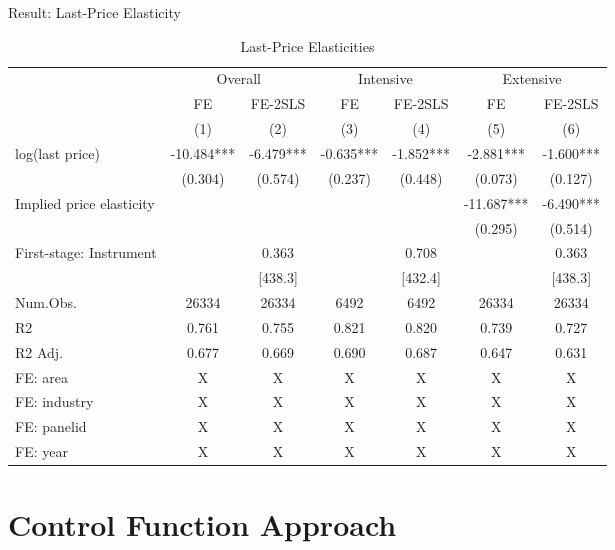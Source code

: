 \documentclass[
  ignorenonframetext,
  aspectratio=169,
]{beamer}
\begin{document}
\begin{frame}{Result: Last-Price Elasticity}
\protect\hypertarget{result-last-price-elasticity}{}
\begin{table}

\caption{\label{tab:unnamed-chunk-13}Last-Price Elasticities}
\centering
\fontsize{7}{9}\selectfont
\begin{tabular}[t]{lcccccc}
\toprule
\multicolumn{1}{c}{ } & \multicolumn{2}{c}{Overall} & \multicolumn{2}{c}{Intensive} & \multicolumn{2}{c}{Extensive} \\
\cmidrule(l{3pt}r{3pt}){2-3} \cmidrule(l{3pt}r{3pt}){4-5} \cmidrule(l{3pt}r{3pt}){6-7}
\multicolumn{1}{c}{ } & \multicolumn{1}{c}{FE} & \multicolumn{1}{c}{FE-2SLS} & \multicolumn{1}{c}{FE} & \multicolumn{1}{c}{FE-2SLS} & \multicolumn{1}{c}{FE} & \multicolumn{1}{c}{FE-2SLS} \\
\cmidrule(l{3pt}r{3pt}){2-2} \cmidrule(l{3pt}r{3pt}){3-3} \cmidrule(l{3pt}r{3pt}){4-4} \cmidrule(l{3pt}r{3pt}){5-5} \cmidrule(l{3pt}r{3pt}){6-6} \cmidrule(l{3pt}r{3pt}){7-7}
  & (1) & (2) & (3) & (4) & (5) & (6)\\
\midrule
log(last price) & -10.484*** & -6.479*** & -0.635*** & -1.852*** & -2.881*** & -1.600***\\
 & (0.304) & (0.574) & (0.237) & (0.448) & (0.073) & (0.127)\\
\midrule
Implied price elasticity &  &  &  &  & -11.687*** & -6.490***\\
 &  &  &  &  & (0.295) & (0.514)\\
First-stage: Instrument &  & 0.363 &  & 0.708 &  & 0.363\\
 &  & [438.3] &  & [432.4] &  & [438.3]\\
Num.Obs. & 26334 & 26334 & 6492 & 6492 & 26334 & 26334\\
R2 & 0.761 & 0.755 & 0.821 & 0.820 & 0.739 & 0.727\\
R2 Adj. & 0.677 & 0.669 & 0.690 & 0.687 & 0.647 & 0.631\\
FE: area & X & X & X & X & X & X\\
FE: industry & X & X & X & X & X & X\\
FE: panelid & X & X & X & X & X & X\\
FE: year & X & X & X & X & X & X\\
\bottomrule
\end{tabular}
\end{table}
\end{frame}

\hypertarget{control-function-approach}{%
\section{Control Function Approach}\label{control-function-approach}}
\end{document}
